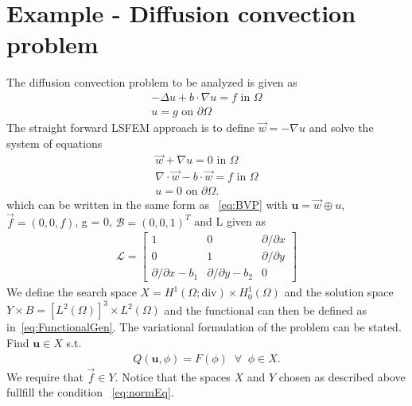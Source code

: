 \section{Example - Diffusion convection problem}
%
The diffusion convection problem to be analyzed is given as 
\begin{align}
	-\Delta u + b \cdot \nabla u = f \text{ in } \Omega \\
	u = g \text{ on } \partial \Omega
	\label{eq:DiffTrans}
\end{align}
The straight forward LSFEM approach is to define $\vec{w} = -\nabla u$ and solve the system of equations 
\begin{align}
	\vec{w} + \nabla u = 0 \text{ in } \Omega \\
	\nabla \cdot \vec{w} - b \cdot \vec{w} = f \text{ in } \Omega \\
	u = 0 \text{ on } \partial \Omega.
	\label{eq:DiffTransSystem}
\end{align}
which can be written in the same form as ~\ref{eq:BVP} with $ \mathbf{u} = \vec{w} \oplus u $, $\vec{f} = (0,0,f)$, g = 0, $\mathcal{B} = (0,0,1)^T $ and L given as 
\begin{align}
	\mathcal{L} =
	\begin{bmatrix}
		1 & 0 & \partial / \partial x  \\
		0 & 1 & \partial / \partial y  \\
		\partial / \partial x - b_1 & \partial/ \partial y -b_2 & 0
	\end{bmatrix}
	\label{eq:AmatrixDiff}
\end{align}
We define the search space $X =  H^1(\Omega;\text{div}) \times H_0^1(\Omega)$ and the solution space $Y \times B  = [L^2(\Omega)]^3\times L^2(\Omega) $ and the functional can then be defined as in~\ref{eq:FunctionalGen}. The variational formulation of the problem can be stated. Find $ \mathbf{u} \in X $ s.t.
\begin{align}
	Q(\mathbf{u},\phi) = F(\phi) \;\; \forall \;\; \phi \in X.
	\label{eq:VariationalFormulationPoisson}
\end{align}
We require that $\vec{f} \in Y$.
Notice that the spaces $X$ and $Y$ chosen as described above fullfill the condition ~\ref{eq:normEq}. 


